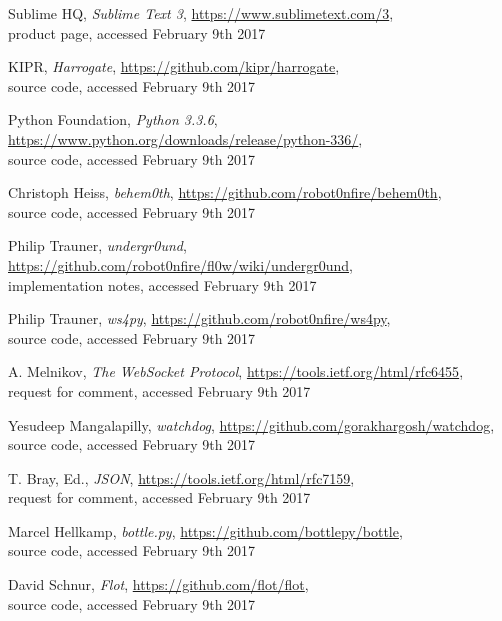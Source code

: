 \documentclass[conference]{IEEEtran}
\begin{document}
\begin{thebibliography}{1}

Sublime HQ, \emph{Sublime Text 3}, \url{https://www.sublimetext.com/3},\\ product page,
accessed February 9th 2017

KIPR, \emph{Harrogate}, \url{https://github.com/kipr/harrogate},\\ source code,
accessed February 9th 2017

Python Foundation, \emph{Python 3.3.6}, \url{https://www.python.org/downloads/release/python-336/},\\ source code,
accessed February 9th 2017

Christoph Heiss, \emph{behem0th}, \url{https://github.com/robot0nfire/behem0th},\\ source code,
accessed February 9th 2017

Philip Trauner, \emph{undergr0und}, \url{https://github.com/robot0nfire/fl0w/wiki/undergr0und},\\ implementation notes,
accessed February 9th 2017

Philip Trauner, \emph{ws4py}, \url{https://github.com/robot0nfire/ws4py},\\ source code,
accessed February 9th 2017

A. Melnikov, \emph{The WebSocket Protocol}, \url{https://tools.ietf.org/html/rfc6455},\\ request for comment,
accessed February 9th 2017

Yesudeep Mangalapilly, \emph{watchdog}, \url{https://github.com/gorakhargosh/watchdog},\\ source code,
accessed February 9th 2017

T. Bray, Ed., \emph{JSON}, \url{https://tools.ietf.org/html/rfc7159},\\ request for comment,
accessed February 9th 2017

Marcel Hellkamp, \emph{bottle.py}, \url{https://github.com/bottlepy/bottle},\\ source code,
accessed February 9th 2017

David Schnur, \emph{Flot}, \url{https://github.com/flot/flot},\\ source code,
accessed February 9th 2017


\end{thebibliography}
\end{document}
